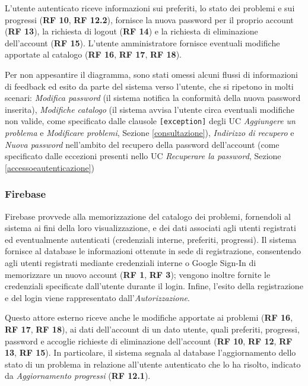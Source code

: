 \documentclass[11pt, a4paper]{article}
\theoremstyle{definition} %
\begin{document}
L'utente autenticato riceve informazioni sui preferiti, lo stato dei problemi
e sui progressi (\textbf{RF 10}, \textbf{RF 12.2}), fornisce la nuova password
per il proprio account (\textbf{RF 13}), la richiesta di logout (\textbf{RF 14})
e la richiesta di eliminazione dell'account (\textbf{RF 15}).
L'utente amministratore fornisce eventuali modifiche apportate al catalogo
(\textbf{RF 16}, \textbf{RF 17}, \textbf{RF 18}).

Per non appesantire il diagramma, sono stati omessi alcuni flussi di informazioni
di feedback ed esito da parte del sistema verso l'utente, che si ripetono in molti
scenari: \textit{Modifica password} (il sistema notifica la conformità della
nuova password inserita), \textit{Modifiche catalogo} (il sistema avvisa l'utente
circa eventuali modifiche non valide, come specificato dalle clausole
\texttt{[exception]} degli UC \textit{Aggiungere un problema} e \textit{Modificare
problemi}, Sezione \ref{consultazione}), \textit{Indirizzo di recupero} e
\textit{Nuova password} nell'ambito del recupero della password dell'account
(come specificato dalle eccezioni presenti nello UC \textit{Recuperare la
password}, Sezione \ref{accessoeautenticazione})

\subsubsection*{Firebase}
Firebase provvede alla memorizzazione del catalogo dei problemi, fornendoli
al sistema ai fini della loro visualizzazione, e dei dati associati agli utenti
registrati ed eventualmente autenticati (credenziali interne, preferiti,
progressi). Il sistema fornisce al database le informazioni ottenute in sede
di registrazione, consentendo agli utenti registrati mediante credenziali
interne o Google Sign-In di memorizzare un nuovo account (\textbf{RF 1},
\textbf{RF 3}); vengono inoltre fornite le credenziali specificate
dall'utente durante il login. Infine, l'esito della registrazione e del
login viene rappresentato dall'\textit{Autorizzazione}.

Questo attore esterno riceve anche le modifiche apportate
ai problemi (\textbf{RF 16}, \textbf{RF 17}, \textbf{RF 18}), ai dati
dell'account di un dato utente, quali preferiti, progressi, password e
accoglie richieste di eliminazione dell'account (\textbf{RF 10}, \textbf{RF 12},
\textbf{RF 13}, \textbf{RF 15}). In particolare, il sistema segnala al database
l'aggiornamento dello stato di un problema in relazione all'utente autenticato
che lo ha risolto, indicato da \textit{Aggiornamento progressi}
(\textbf{RF 12.1}).
\end{document}
